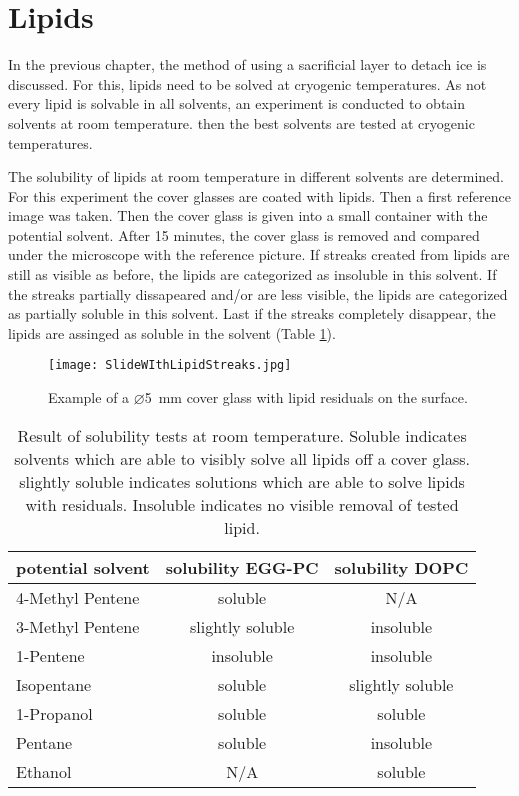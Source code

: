 


\section{Lipids}

In the previous chapter, the method of using a sacrificial layer to detach ice is discussed. For this, lipids need to be solved at cryogenic temperatures. As not every lipid is solvable in all solvents, an experiment is conducted to obtain solvents at room temperature. then the best solvents are tested at cryogenic temperatures.

The solubility of lipids at room temperature in different solvents are determined. For this experiment the cover glasses are coated with lipids. Then a first reference image was taken. Then the cover glass is given into a small container with the potential solvent. After 15 minutes, the cover glass is removed and compared under the microscope with the reference picture. If streaks created from lipids are still as visible as before, the lipids are categorized as insoluble in this solvent. If the streaks partially dissapeared and/or are less visible, the lipids are categorized as partially soluble in this solvent. Last if the streaks completely disappear, the lipids are assinged as soluble in the solvent (Table \ref{table:LoeslichkeitRaumtemperatur}).

\begin{figure}[hbt!]
	\centering
	\texttt{[image: SlideWIthLipidStreaks.jpg]}
	\caption{Example of a $\varnothing$\SI{5}{\milli\meter} cover glass with lipid residuals on the surface.}
\end{figure}


\begin{table}[hbt!]
	\centering
	\begin{tabular}{|l|c|c|}
		\hline
		potential solvent & solubility EGG-PC & solubility DOPC \\
		\hline
		\hline
		4-Methyl Pentene & soluble & N/A  \\ 
		\hline
		3-Methyl Pentene & slightly soluble & insoluble \\
		\hline
		1-Pentene & insoluble & insoluble \\
		\hline
		Isopentane & soluble & slightly soluble\\
		\hline
		1-Propanol & soluble & soluble\\
		\hline
		Pentane & soluble & insoluble\\
		\hline
		Ethanol & N/A & soluble\\
		\hline
	\end{tabular}
	\caption{Result of solubility tests at room temperature. Soluble indicates solvents which are able to visibly solve all lipids off a cover glass. slightly soluble indicates solutions which are able to solve lipids with residuals. Insoluble indicates no visible removal of tested lipid.}
	\label{table:LoeslichkeitRaumtemperatur}
\end{table}

